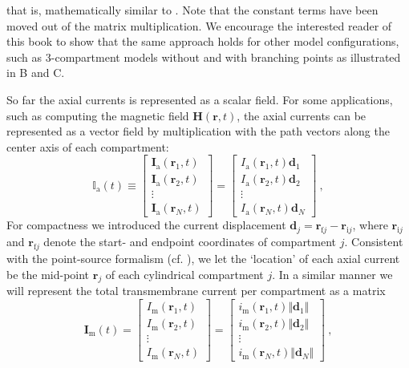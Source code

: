 %
that is, mathematically similar to . 
Note that the constant terms have been moved out of the matrix multiplication.
We encourage the interested reader of this book to show that the same approach holds for other model configurations, such
as 3-compartment models without and with branching points as illustrated in B and C.

So far\sntxt{,} the axial currents is represented as a scalar field.
For some applications, such as computing the magnetic field $\mathbf{H}(\mathbf{r}, t)$,
the axial currents can be represented as a vector field by multiplication with the path vectors along the center axis of each compartment:
%
\begin{equation}
\mathbb{I}_\mathrm{a}(t) \equiv
\begin{bmatrix}
\mathbf{I}_\mathrm{a}(\mathbf{r}_1, t)\\
\mathbf{I}_\mathrm{a}(\mathbf{r}_2, t)\\
\vdots \\
\mathbf{I}_\mathrm{a}(\mathbf{r}_N, t)
\end{bmatrix}
=
\begin{bmatrix}
I_\mathrm{a}(\mathbf{r}_1, t) \mathbf{d}_1 \\
I_\mathrm{a}(\mathbf{r}_2, t) \mathbf{d}_2 \\
\vdots \\
I_\mathrm{a}(\mathbf{r}_N, t) \mathbf{d}_N
\end{bmatrix} ~,
\end{equation}
%
For compactness\sntxt{,} we introduced the current displacement $\mathbf{d}_j=\mathbf{r}_{\mathrm{f}j} - \mathbf{r}_{\mathrm{i}j}$,
where $\mathbf{r}_{\mathrm{i}j}$ and $\mathbf{r}_{\mathrm{f}j}$ denote the start- and endpoint coordinates of compartment $j$.
Consistent with the point-source formalism (cf. ),
we let the `location' of each axial current be the mid-point $\mathbf{r}_j$ of each cylindrical compartment $j$.
In a similar manner we will represent the total transmembrane current per compartment as a matrix
\begin{equation}
\mathbf{I}_\mathrm{m}(t) =
\begin{bmatrix}
I_\mathrm{m}(\mathbf{r}_1, t) \\
I_\mathrm{m}(\mathbf{r}_2, t) \\
\vdots \\
I_\mathrm{m}(\mathbf{r}_N, t)
\end{bmatrix}
=
\begin{bmatrix}
i_\mathrm{m}(\mathbf{r}_1, t) \Vert \mathbf{d}_1 \Vert \\
i_\mathrm{m}(\mathbf{r}_2, t) \Vert \mathbf{d}_2 \Vert \\
\vdots \\
i_\mathrm{m}(\mathbf{r}_N, t) \Vert \mathbf{d}_N \Vert
\end{bmatrix} ~,
\end{equation}
